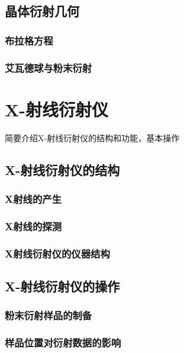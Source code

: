 \documentclass[12pt,a4paper]{ctexart}
\newcommand{\smtext}[1]{{\fontsize{9.3pt}{12pt}\selectfont #1}}
\begin{document}
\subsection{晶体衍射几何}

\subsubsection{布拉格方程}

\subsubsection{艾瓦德球与粉末衍射}

\section{X-射线衍射仪}

\smtext{简要介绍X-射线衍射仪的结构和功能，基本操作}

\subsection{X-射线衍射仪的结构}

\subsubsection{X射线的产生}

\subsubsection{X射线的探测}

\subsubsection{X射线衍射仪的仪器结构}

\subsection{X-射线衍射仪的操作}

\subsubsection{粉末衍射样品的制备}

\subsubsection{样品位置对衍射数据的影响}
\end{document}
